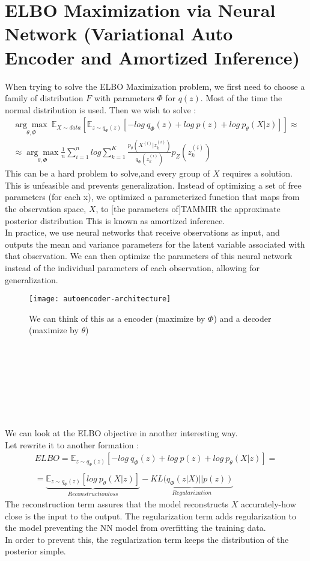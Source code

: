 \section*{ELBO Maximization via Neural Network (Variational Auto Encoder and Amortized Inference)}
When trying to solve the ELBO Maximization problem, we first need to choose a family of distribution $F$ with parameters $\Phi$ for $q(z)$. Most of the time the normal distribution is used. Then we wish to solve : 
\begin{gather*}
\underset{\theta, \Phi}{\arg\max} \ \mathbb{E}_{X\sim data}[\mathbb{E}_{z \sim q_{\Phi}(z)}[-log \ q_{\Phi}(z) + log \ p(z) + log \ p_{\theta}(X|z)]] \approx \\
\approx \underset{\theta, \Phi}{\arg\max} \frac{1}{n}\sum_{i=1}^{n}log \sum_{k=1}^{K}\frac{p_{\theta}(X^{(i)}|z_{k}^{(i)})}{q_{\Phi}(z_{k}^{(i)})}p_{Z}(z_{k}^{(i)})
\end{gather*}
This can be a hard problem to solve,and every group of $X$ requires a solution. This is unfeasible and prevents generalization. Instead of optimizing a set of free parameters (for each x), we optimized a parameterized function that maps from the observation space, $X$, to [the parameters of]TAMMIR the approximate posterior distribution This is known as amortized inference. \\
In practice, we use neural networks that receive observations as input, and outputs the mean and variance parameters for the latent variable associated with that observation. We can then optimize the parameters of this neural network instead of the individual parameters of each observation, allowing for generalization.
\begin{figure}[t]
\texttt{[image: autoencoder-architecture]}
\caption{We can think of this as a encoder (maximize by $\Phi$) and a decoder (maximize by $\theta$)}
\centering
\end{figure}
\\ \\ \\ \\ \\ \\ \\
We can look at the ELBO objective in another interesting way.\\
Let rewrite it to another formation :
\begin{gather*}
ELBO=\mathbb{E}_{z \sim q_{\Phi}(z)}[-log \ q_{\Phi}(z) + log \ p(z) + log \ p_{\theta}(X|z)] = \\ \\
= \underbrace{\mathbb{E}_{z \sim q_{\Phi}(z)}[log \ p_{\theta}(X|z)]}_{Reconstruction loss} - \underbrace{KL(q_{\Phi}(z|X)||p(z))}_{Regularization}
\end{gather*}
The reconstruction term assures that the model reconstructs $X$ accurately-how close is the input to the output. The regularization term adds regularization to the model preventing the NN model from overfitting the training data.\\
In order to prevent this, the regularization term keeps the distribution of the posterior simple. \\ \\

